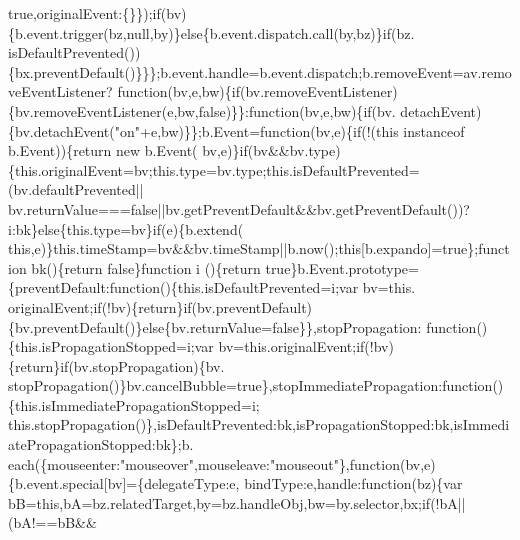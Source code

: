 \begin{DoxyCode}
{      true},originalEvent:\{\}\});\textcolor{keywordflow}{if}(bv)\{b.event.trigger(bz,null,by)\}\textcolor{keywordflow}{else}\{b.event.dispatch.call(by,bz)\}\textcolor{keywordflow}{if}(bz.
      isDefaultPrevented())\{bx.preventDefault()\}\}\};b.event.handle=b.event.dispatch;b.removeEvent=av.removeEventListener?\textcolor{keyword}{
      function}(bv,e,bw)\{\textcolor{keywordflow}{if}(bv.removeEventListener)\{bv.removeEventListener(e,bw,\textcolor{keyword}{false})\}\}:\textcolor{keyword}{function}(bv,e,bw)\{\textcolor{keywordflow}{if}(bv.
      detachEvent)\{bv.detachEvent(\textcolor{stringliteral}{"on"}+e,bw)\}\};b.Event=\textcolor{keyword}{function}(bv,e)\{\textcolor{keywordflow}{if}(!(\textcolor{keyword}{this} instanceof b.Event))\{\textcolor{keywordflow}{return} \textcolor{keyword}{new} b.Event(
      bv,e)\}\textcolor{keywordflow}{if}(bv&&bv.type)\{this.originalEvent=bv;this.type=bv.type;this.isDefaultPrevented=(bv.defaultPrevented||
      bv.returnValue===\textcolor{keyword}{false}||bv.getPreventDefault&&bv.getPreventDefault())?i:bk\}\textcolor{keywordflow}{else}\{this.type=bv\}\textcolor{keywordflow}{if}(e)\{b.extend(\textcolor{keyword}{
      this},e)\}this.timeStamp=bv&&bv.timeStamp||b.now();\textcolor{keyword}{this}[b.expando]=\textcolor{keyword}{true}\};\textcolor{keyword}{function} bk()\{\textcolor{keywordflow}{return} \textcolor{keyword}{false}\}\textcolor{keyword}{function} i
      ()\{\textcolor{keywordflow}{return} \textcolor{keyword}{true}\}b.Event.prototype=\{preventDefault:\textcolor{keyword}{function}()\{this.isDefaultPrevented=i;var bv=this.
      originalEvent;\textcolor{keywordflow}{if}(!bv)\{\textcolor{keywordflow}{return}\}\textcolor{keywordflow}{if}(bv.preventDefault)\{bv.preventDefault()\}\textcolor{keywordflow}{else}\{bv.returnValue=\textcolor{keyword}{false}\}\},stopPropagation:\textcolor{keyword}{
      function}()\{this.isPropagationStopped=i;var bv=this.originalEvent;\textcolor{keywordflow}{if}(!bv)\{\textcolor{keywordflow}{return}\}\textcolor{keywordflow}{if}(bv.stopPropagation)\{bv.
      stopPropagation()\}bv.cancelBubble=\textcolor{keyword}{true}\},stopImmediatePropagation:\textcolor{keyword}{function}()\{this.isImmediatePropagationStopped=i;
      this.stopPropagation()\},isDefaultPrevented:bk,isPropagationStopped:bk,isImmediatePropagationStopped:bk\};b.
      each(\{mouseenter:\textcolor{stringliteral}{"mouseover"},mouseleave:\textcolor{stringliteral}{"mouseout"}\},\textcolor{keyword}{function}(bv,e)\{b.event.special[bv]=\{delegateType:e,
      bindType:e,handle:\textcolor{keyword}{function}(bz)\{var bB=\textcolor{keyword}{this},bA=bz.relatedTarget,by=bz.handleObj,bw=by.selector,bx;\textcolor{keywordflow}{if}(!bA||(bA!==bB&&

\end{DoxyCode}
